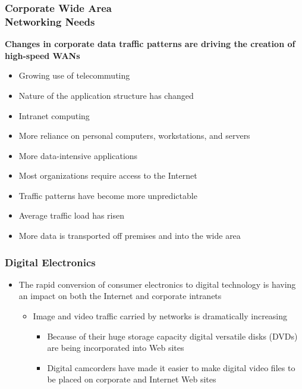 \documentclass[pdflatex,compress]{beamer}
\begin{document}
\begin{frame}
	\frametitle{Corporate Wide Area\\Networking Needs}
	\textbf{Changes in corporate data traffic patterns are driving the creation of high-speed WANs}
	\begin{itemize}
		\item Growing use of telecommuting
		\item Nature of the application structure has changed
		\item Intranet computing
		\item More reliance on personal computers, workstations, and servers
		\item More data-intensive applications
		\item Most organizations require access to the Internet
		\item Traffic patterns have become more unpredictable
		\item Average traffic load has risen
		\item More data is transported off premises and into the wide area
	\end{itemize}
\end{frame}

\begin{frame}
	\frametitle{Digital Electronics}
	\begin{itemize}
		\item The rapid conversion of consumer electronics to digital technology is having an impact on both the Internet and corporate intranets
		\begin{itemize}
			\item Image and video traffic carried by networks is dramatically increasing
			\begin{itemize}
				\item Because of their huge storage capacity digital versatile disks (DVDs) are being incorporated into Web sites
				\item Digital camcorders have made it easier to make digital video files to be placed on corporate and Internet Web sites
			\end{itemize}
		\end{itemize}
	\end{itemize}
\end{frame}
\end{document}
